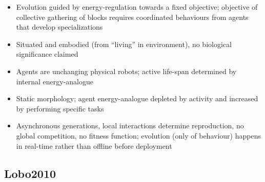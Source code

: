 		\begin{itemize}
			\item
			
			Evolution guided by energy-regulation towards a fixed objective;
			objective of collective gathering of blocks requires coordinated
			behaviours from agents that develop specializations
			
			\item
			
			Situated and embodied (from ``living'' in environment), no biological
			significance claimed
			
			\item
			
			Agents are unchanging physical robots; active life-span determined by
			internal energy-analogue
			
			\item
			
			Static morphology; agent energy-analogue depleted by activity and
			increased by performing specific tasks
			
			\item
			
			Asynchronous generations, local interactions determine reproduction,
			no global competition, no fitness function; evolution (only of
			behaviour) happens in real-time rather than offline before deployment
			
		\end{itemize}
		
		\hypertarget{lobo2010}{\subsection{Lobo2010}\label{lobo2010}}
		
